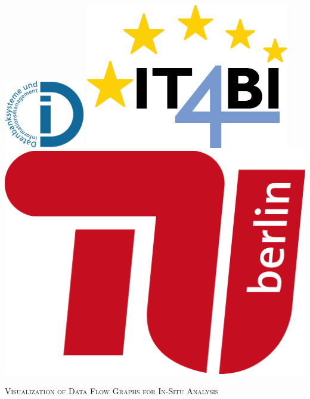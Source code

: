 \documentclass[%
   a4paper,%
  11pt,                    %
  openright,              %
  headsepline,          %
  cleardoubleempty,
  chapterprefix,
  titlepage,%
  liststotoc,%
  bibtotoc,%
  idxtotoc,%
  headinclude,           %
  pointlessnumbers,%
  USenglish
  ]{scrbook}
\theoremstyle{break}
\begin{document}
\begin{titlepage}
\begin{center}
 
\includegraphics[height=0.13\textheight]{logo_dima.png}
\hfill
\includegraphics[height=0.15\textheight]{logo_it4bi.png}
\hfill
\includegraphics[height=0.13\textheight]{tub_logo.png}
 
 
\vspace*{1.5cm}
 
\LARGE
\textsc{Visualization of Data Flow Graphs for In-Situ Analysis}
 

\end{center}
\end{titlepage}
\end{document}

